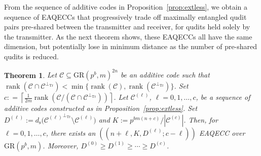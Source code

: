 \documentclass{article}
\DeclareMathOperator{\Tr}{Tr}
\DeclareMathOperator{\rank}{rank}
\newtheorem{thm}{Theorem}[section]
\theoremstyle{remark}
\theoremstyle{definition}
\numberwithin{equation}{section}
\begin{document}
From the sequence of additive codes in Proposition~\ref{prop:extless}, we obtain a sequence of EAQECCs that progressively trade off maximally entangled qudit pairs pre-shared between the transmitter and receiver, for qudits held solely by the transmitter. As the next theorem shows, these EAQECCs all have the same dimension, but potentially lose in minimum distance as the number of pre-shared qudits is reduced.

\begin{thm}\label{thm:less} 
Let $\mathcal{C} \subseteq \text{GR}(p^b,m)^{2n}$ be an additive code such that $\rank(\mathcal{C}  \cap  \mathcal{C}^{\perp_{\Tr}}) < \min\{\rank(\mathcal{C}),\rank(\mathcal{C}^{\perp_{\Tr}})\}$. Set $c : = \left\lceil\frac{1}{2m}\rank(\mathcal{C}/(\mathcal{C} \cap \mathcal{C}^{\perp_{\Tr}}))\right\rceil$. Let $\mathcal{C}^{(\ell)}$, $\ell = 0,1,\ldots,c$, be a sequence of additive codes constructed as in Proposition~\ref{prop:extless}. Set $D^{(\ell)} := d_{\mathrm{s}}\bigl({\mathcal{C}^{(\ell)}}^{\perp_{\Tr}} \setminus \mathcal{C}^{(\ell)}\bigr)$ and $K := p^{bm(n+c)}/|\mathcal{C}^{(c)}|$. Then, for $\ell = 0,1,\ldots,c$, there exists an $((n+\ell,K,D^{(\ell)};c-\ell))$ EAQECC over $\text{GR}(p^b,m)$. Moreover, $D^{(0)} \ge D^{(1)} \ge \cdots \ge D^{(c)}$.
\end{thm}
\end{document}
